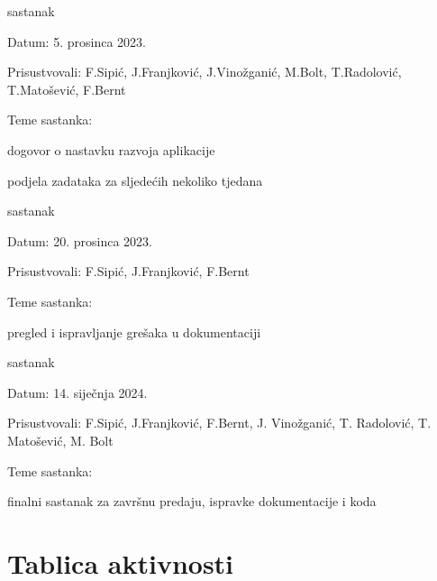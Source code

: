 \begin{packed_enum}
			\item  sastanak
			\item[] \begin{packed_item}
				\item Datum: 5. prosinca 2023.
				\item Prisustvovali: F.Sipić, J.Franjković, J.Vinožganić, M.Bolt, T.Radolović, T.Matošević, F.Bernt
				\item Teme sastanka:
				\begin{packed_item}
					\item  dogovor o nastavku razvoja aplikacije
					\item podjela zadataka za sljedećih nekoliko tjedana
				\end{packed_item}
			\end{packed_item}

			\item  sastanak
			\item[] \begin{packed_item}
				\item Datum: 20. prosinca 2023.
				\item Prisustvovali: F.Sipić, J.Franjković, F.Bernt
				\item Teme sastanka:
				\begin{packed_item}
					\item  pregled i ispravljanje grešaka u dokumentaciji
				\end{packed_item}
			\end{packed_item}
			
			\item  sastanak
			\item[] \begin{packed_item}
				\item Datum: 14. siječnja 2024.
				\item Prisustvovali: F.Sipić, J.Franjković, F.Bernt, J. Vinožganić, T. Radolović, T. Matošević, M. Bolt
				\item Teme sastanka:
				\begin{packed_item}
					\item  finalni sastanak za završnu predaju, ispravke dokumentacije i koda
				\end{packed_item}
			\end{packed_item}
			
			
		\end{packed_enum}
		
		\eject
		\section*{Tablica aktivnosti}
		
